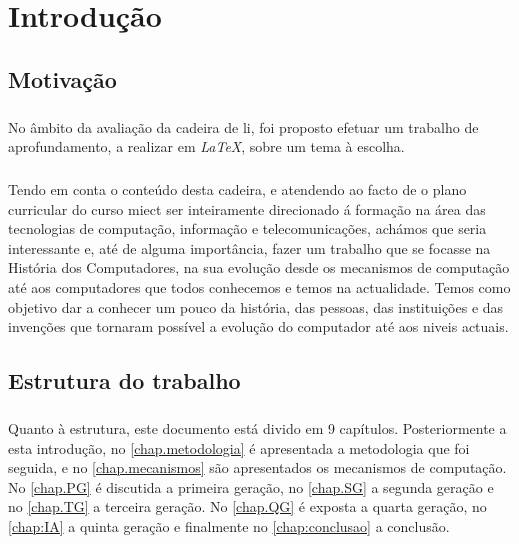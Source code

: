 \documentclass{report}
\begin{document}
\chapter{Introdução}
\label{chap.introducao}
\large
\section{Motivação}
\paragraph{}
No âmbito da avaliação da cadeira de \acs{li}, foi proposto efetuar um trabalho de aprofundamento, a realizar em \textit{LaTeX}, sobre um tema à escolha. 
\paragraph{}
Tendo em conta o conteúdo desta cadeira, e atendendo ao facto de o plano curricular do curso \acs{miect} ser inteiramente direcionado á formação na área das tecnologias de computação, informação e telecomunicações, achámos que seria interessante e, até de alguma importância, fazer um trabalho que se focasse na História dos Computadores, na sua evolução desde os mecanismos de computação até aos computadores que todos conhecemos e temos na actualidade.
Temos como objetivo dar a conhecer um pouco da história, das pessoas, das instituições e das invenções que tornaram possível a evolução do computador até aos niveis actuais.
\section{Estrutura do trabalho}
\paragraph{}
Quanto à estrutura, este documento está divido em 9 capítulos. Posteriormente a esta introdução, no \autoref{chap.metodologia} é apresentada a metodologia que foi seguida, e no \autoref{chap.mecanismos} são apresentados os mecanismos de computação. No \autoref{chap.PG} é discutida a primeira geração, no \autoref{chap.SG} a segunda geração e no \autoref{chap.TG} a terceira geração. No \autoref{chap.QG} é exposta a quarta geração, no \autoref{chap:IA} a quinta geração e finalmente no \autoref{chap:conclusao} a conclusão.



\end{document}
